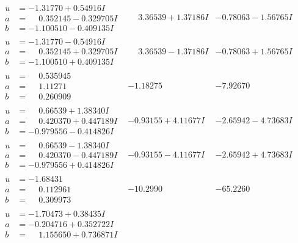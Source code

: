 \documentclass[1p]{elsarticle_modified}
\theoremstyle{definition}
\begin{document}
$$\begin{array}{c|c|c}
\begin{aligned}
u &= -1.31770 + 0.54916 I \\
a &= \phantom{-}0.352145 - 0.329705 I \\
b &= -1.100510 - 0.409135 I\end{aligned}
 & \phantom{-}3.36539 + 1.37186 I & -0.78063 - 1.56765 I \\ \hline\begin{aligned}
u &= -1.31770 - 0.54916 I \\
a &= \phantom{-}0.352145 + 0.329705 I \\
b &= -1.100510 + 0.409135 I\end{aligned}
 & \phantom{-}3.36539 - 1.37186 I & -0.78063 + 1.56765 I \\ \hline\begin{aligned}
u &= \phantom{-}0.535945\phantom{ +0.000000I} \\
a &= \phantom{-}1.11271\phantom{ +0.000000I} \\
b &= \phantom{-}0.260909\phantom{ +0.000000I}\end{aligned}
 & -1.18275\phantom{ +0.000000I} & -7.92670\phantom{ +0.000000I} \\ \hline\begin{aligned}
u &= \phantom{-}0.66539 + 1.38340 I \\
a &= \phantom{-}0.420370 + 0.447189 I \\
b &= -0.979556 - 0.414826 I\end{aligned}
 & -0.93155 + 4.11677 I & -2.65942 - 4.73683 I \\ \hline\begin{aligned}
u &= \phantom{-}0.66539 - 1.38340 I \\
a &= \phantom{-}0.420370 - 0.447189 I \\
b &= -0.979556 + 0.414826 I\end{aligned}
 & -0.93155 - 4.11677 I & -2.65942 + 4.73683 I \\ \hline\begin{aligned}
u &= -1.68431\phantom{ +0.000000I} \\
a &= \phantom{-}0.112961\phantom{ +0.000000I} \\
b &= \phantom{-}0.309973\phantom{ +0.000000I}\end{aligned}
 & -10.2990\phantom{ +0.000000I} & -65.2260\phantom{ +0.000000I} \\ \hline\begin{aligned}
u &= -1.70473 + 0.38435 I \\
a &= -0.204716 + 0.352722 I \\
b &= \phantom{-}1.155650 + 0.736871 I\end{aligned}

\end{array}$$
\end{document}
